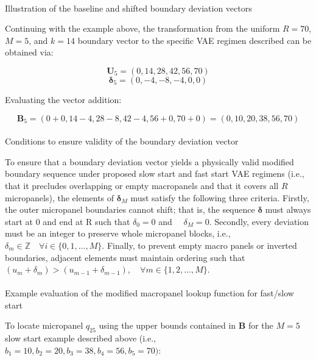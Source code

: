 \documentclass[
  number]{elsarticle}
\makeatletter
\let\oldparagraph\paragraph
\renewcommand{\paragraph}{
    \@ifstar
      \xxxParagraphStar
      \xxxParagraphNoStar
  }
\newcommand{\xxxParagraphStar}[1]{\oldparagraph*{#1}\mbox{}}
\newcommand{\xxxParagraphNoStar}[1]{\oldparagraph{#1}\mbox{}}
\makeatother
\begin{document}
\paragraph{Illustration of the baseline and shifted boundary deviation
vectors}\label{illustration-of-the-baseline-and-shifted-boundary-deviation-vectors}

Continuing with the example above, the transformation from the uniform
\(R = 70\), \(M = 5\), and \(k = 14\) boundary vector to the specific
VAE regimen described can be obtained via:

\[\mathbf{U}_5 = (0, 14, 28, 42, 56, 70)\]
\[\boldsymbol{\delta}_5 = (0, -4, -8, -4, 0, 0)\]

Evaluating the vector addition:

\[\mathbf{B}_5 = (0 + 0, 14 - 4, 28 - 8, 42 - 4, 56 + 0, 70 + 0) = (0, 10, 20, 38, 56, 70)\]

\paragraph{Conditions to ensure validity of the boundary deviation
vector}\label{conditions-to-ensure-validity-of-the-boundary-deviation-vector}

To ensure that a boundary deviation vector yields a physically valid
modified boundary sequence under proposed slow start and fast start VAE
regimens (i.e., that it precludes overlapping or empty macropanels and
that it covers all \(R\) micropanels), the elements of
\(\boldsymbol{\delta}_M\) must satisfy the following three criteria.
Firstly, the outer micropanel boundaries cannot shift; that is, the
sequence \(\boldsymbol{\delta}\) must always start at 0 and end at R
such that \(\delta_0 = 0\) and \(\quad \delta_M = 0\). Secondly, every
deviation must be an integer to preserve whole micropanel blocks, i.e.,
\(\delta_m \in \mathbb{Z} \quad \forall i \in \{0, 1, \dots, M\}\).
Finally, to prevent empty macro panels or inverted boundaries, adjacent
elements must maintain ordering such that
\((u_m + \delta_m) > (u_{m-1} + \delta_{m-1}), \quad \forall m \in \{1, 2, \dots, M\}\).

\paragraph{Example evaluation of the modified macropanel lookup function
for fast/slow
start}\label{example-evaluation-of-the-modified-macropanel-lookup-function-for-fastslow-start}

To locate micropanel \(q_{25}\) using the upper bounds contained in
\(\mathbf{B}\) for the \(M = 5\) slow start example described above
(i.e., \(b_1=10, b_2=20, b_3=38, b_4=56, b_5 = 70)\):
\end{document}
